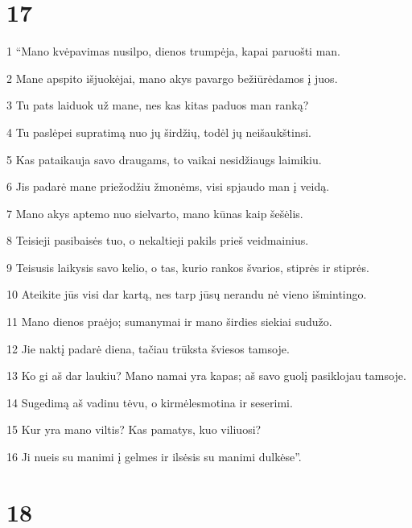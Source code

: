 \chapter{17}


\par 1 “Mano kvėpavimas nusilpo, dienos trumpėja, kapai paruošti man. 
\par 2 Mane apspito išjuokėjai, mano akys pavargo bežiūrėdamos į juos. 
\par 3 Tu pats laiduok už mane, nes kas kitas paduos man ranką? 
\par 4 Tu paslėpei supratimą nuo jų širdžių, todėl jų neišaukštinsi. 
\par 5 Kas pataikauja savo draugams, to vaikai nesidžiaugs laimikiu. 
\par 6 Jis padarė mane priežodžiu žmonėms, visi spjaudo man į veidą. 
\par 7 Mano akys aptemo nuo sielvarto, mano kūnas kaip šešėlis. 
\par 8 Teisieji pasibaisės tuo, o nekaltieji pakils prieš veidmainius. 
\par 9 Teisusis laikysis savo kelio, o tas, kurio rankos švarios, stiprės ir stiprės. 
\par 10 Ateikite jūs visi dar kartą, nes tarp jūsų nerandu nė vieno išmintingo. 
\par 11 Mano dienos praėjo; sumanymai ir mano širdies siekiai sudužo. 
\par 12 Jie naktį padarė diena, tačiau trūksta šviesos tamsoje. 
\par 13 Ko gi aš dar laukiu? Mano namai yra kapas; aš savo guolį pasiklojau tamsoje. 
\par 14 Sugedimą aš vadinu tėvu, o kirmėles­motina ir seserimi. 
\par 15 Kur yra mano viltis? Kas pamatys, kuo viliuosi? 
\par 16 Ji nueis su manimi į gelmes ir ilsėsis su manimi dulkėse”.



\chapter{18}


